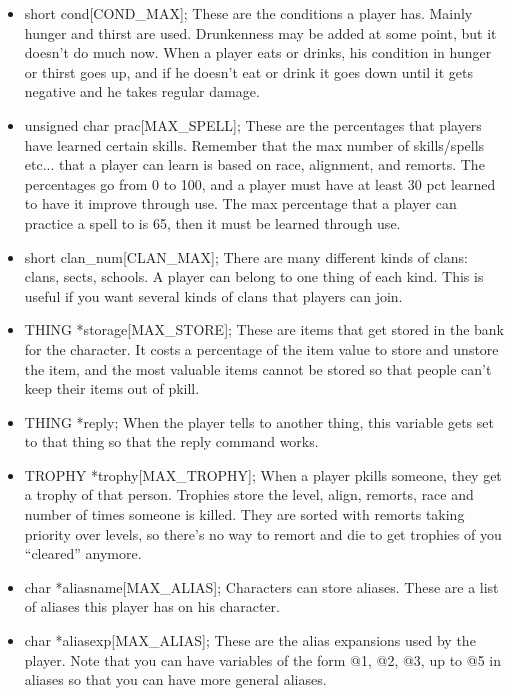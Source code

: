 \begin{itemize}
 \item short cond[COND\_MAX];         These are the conditions a
 player has. Mainly hunger and thirst are used. Drunkenness may be
 added at some point, but it doesn't do much now. When a player eats
 or drinks, his condition in hunger or thirst goes up, and if he
 doesn't eat or drink it goes down until it gets negative and he takes
 regular damage.

\item  unsigned char prac[MAX\_SPELL]; These are the percentages that
 players have learned certain skills. Remember that the max number of
 skills/spells etc... that a player can learn is based on race,
 alignment, and remorts. The percentages go from 0 to 100, and a
 player must have at least 30 pct learned to have it improve through
 use. The max percentage that a player can practice a spell to is 65,
 then it must be learned through use.


 \item short clan\_num[CLAN\_MAX];    There are many different kinds
 of clans: clans, sects, schools. A player can belong to one thing of
 each kind. This is useful if you want several kinds of clans that
 players can join.

\item  THING *storage[MAX\_STORE];      These are items that get
 stored in the bank for the character. It costs a percentage of the
 item value to store and unstore the item, and the most valuable items
 cannot be stored so that people can't keep their items out of pkill.



\item  THING *reply;                When the player tells to another
 thing, this variable gets set to that thing so that the reply command
 works.

\item  TROPHY *trophy[MAX\_TROPHY]; When a player pkills someone, they
 get a trophy of that person. Trophies store the level, align,
 remorts, race and number of times someone is killed. They are sorted
 with remorts taking priority over levels, so there's no way to remort
 and die to get trophies of you ``cleared'' anymore.

\item  char *aliasname[MAX\_ALIAS];    Characters can store aliases. These
  are a list of aliases this player has on his character.

\item  char *aliasexp[MAX\_ALIAS];   These are the alias expansions used by
  the player. Note that you can have variables of the form @1, @2, @3,
  up to @5 in aliases so that you can have more general aliases.


\end{itemize}
